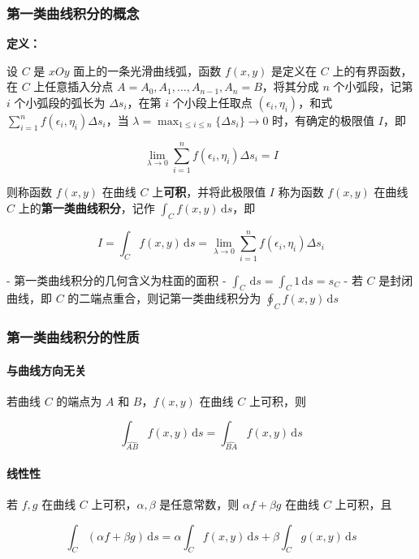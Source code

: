 \documentclass[lang = zh , final , oneside , openany , titlepage , zihao = -4 , linespread = 1.3 , baselineskip = false , cjk-font = windows , text-font = newtx , math-font = newtx]{sjtureport}
\begin{document}
\subsubsection{第一类曲线积分的概念}

\textbf{定义：}

设 \(C\) 是 \(xOy\) 面上的一条光滑曲线弧，函数 \(f(x,y)\) 是定义在 \(C\) 上的有界函数，在 \(C\) 上任意插入分点 \(A = A_0,A_1,\ldots,A_{n - 1},A_n = B\)，将其分成 \(n\) 个小弧段，记第 \(i\) 个小弧段的弧长为 \(\Delta s_i\)，在第 \(i\) 个小段上任取点 \((\epsilon_i,\eta_i)\)，和式 \(\sum_{i = 1}^{n}f(\epsilon_i,\eta_i)\Delta s_i\)，当 \(\lambda=\max_{1\leq i\leq n}\{\Delta s_i\}\to 0\) 时，有确定的极限值 \(I\)，即

\[
\lim_{\lambda\to 0}\sum_{i = 1}^n f(\epsilon_i,\eta_i)\Delta s_i = I
\]

则称函数 \(f(x,y)\) 在曲线 \(C\) 上\textbf{可积}，并将此极限值 \(I\) 称为函数 \(f(x,y)\) 在曲线 \(C\) 上的\textbf{第一类曲线积分}，记作 \(\int_Cf(x,y)\,\mathrm{d}s\)，即

\[
I = \int_C f(x,y)\,\mathrm{d}s = \lim_{\lambda\to 0}\sum_{i = 1}^n f(\epsilon_i,\eta_i)\Delta s_i
\]

- 第一类曲线积分的几何含义为柱面的面积
- \(\int_C\,\mathrm{d}s = \int_C1\,\mathrm{d}s = s_C\)
- 若 \(C\) 是封闭曲线，即 \(C\) 的二端点重合，则记第一类曲线积分为 \(\oint_Cf(x,y)\,\mathrm{d}s\)

\subsubsection{第一类曲线积分的性质}

\paragraph{与曲线方向无关}

若曲线 \(C\) 的端点为 \(A\) 和 \(B\)，\(f(x,y)\) 在曲线 \(C\) 上可积，则

\[
\int_{\widehat{AB}} f(x,y)\,\mathrm{d}s=\int_{\widehat{BA}} f(x,y)\,\mathrm{d}s 
\]

\paragraph{线性性}

若 \(f,g\) 在曲线 \(C\) 上可积，\(\alpha, \beta\) 是任意常数，则 \(\alpha f + \beta g\) 在曲线 \(C\) 上可积，且

\[
\int_C (\alpha f + \beta g)\,\mathrm{d}s = \alpha \int_C f(x,y)\,\mathrm{d}s + \beta \int_C g(x,y)\,\mathrm{d}s
\]
\end{document}
